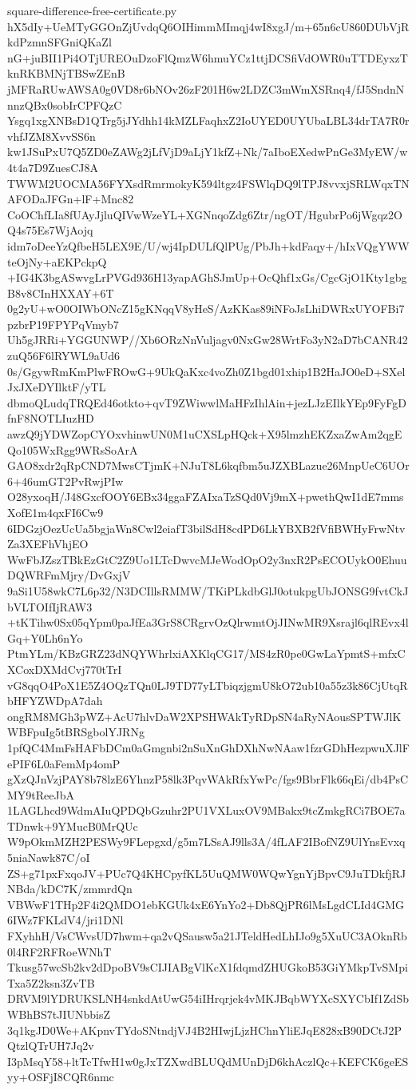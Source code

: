 \documentclass[11pt]{article}
\theoremstyle{definition}
\theoremstyle{remark}
\begin{document}
\begin{filecontents*}[overwrite]{square-difference-free-certificate.py}
hX5dIy+UeMTyGGOnZjUvdqQ6OIHimmMImqj4wI8xgJ/m+65n6cU860DUbVjRkdPzmnSFGniQKaZl
nG+juBII1Pi4OTjUREOuDzoFlQmzW6hmuYCz1ttjDCSfiVdOWR0uTTDEyxzTknRKBMNjTBSwZEnB
jMFRaRUwAWSA0g0VD8r6bNOv26zF201H6w2LDZC3mWmXSRnq4/fJ5SndnNnnzQBx0sobIrCPFQzC
Ysgq1xgXNBsD1QTrg5jJYdhh14kMZLFaqhxZ2IoUYED0UYUbaLBL34drTA7R0rvhfJZM8XvvSS6n
kw1JSuPxU7Q5ZD0eZAWg2jLfVjD9aLjY1kfZ+Nk/7aIboEXedwPnGe3MyEW/w4t4a7D9ZuesCJ8A
TWWM2UOCMA56FYXsdRmrmokyK594ltgz4FSWlqDQ9lTPJ8vvxjSRLWqxTNAFODaJFGn+lF+Mnc82
CoOChfLIa8fUAyJjluQIVwWzeYL+XGNnqoZdg6Ztr/ngOT/HgubrPo6jWgqz2OQ4s75Es7WjAojq
idm7oDeeYzQfbeH5LEX9E/U/wj4IpDULfQlPUg/PbJh+kdFaqy+/hIxVQgYWWteOjNy+aEKPckpQ
+IG4K3bgASwvgLrPVGd936H13yapAGhSJmUp+OcQhf1xGs/CgcGjO1Kty1gbgB8v8CInHXXAY+6T
0g2yU+wO0OIWbONcZ15gKNqqV8yHeS/AzKKas89iNFoJsLhiDWRxUYOFBi7pzbrP19FPYPqVmyb7
Uh5gJRRi+YGGUNWP//Xb6ORzNnVuljagv0NxGw28WrtFo3yN2aD7bCANR42zuQ56F6lRYWL9aUd6
0s/GgywRmKmPlwFROwG+9UkQaKxc4voZh0Z1bgd01xhip1B2HaJO0eD+SXelJxJXeDYIlktF/yTL
dbmoQLudqTRQEd46otkto+qvT9ZWiwwlMaHFzIhlAin+jezLJzEIlkYEp9FyFgDfnF8NOTLIuzHD
awzQ9jYDWZopCYOxvhinwUN0M1uCXSLpHQck+X95lmzhEKZxaZwAm2qgEQo105WxRgg9WRsSoArA
GAO8xdr2qRpCND7MwsCTjmK+NJuT8L6kqfbm5uJZXBLazue26MnpUeC6UOr6+46umGT2PvRwjPIw
O28yxoqH/J48GxcfOOY6EBx34ggaFZAIxaTzSQd0Vj9mX+pwethQwI1dE7mmsXofE1m4qxFI6Cw9
6IDGzjOezUcUa5bgjaWn8Cwl2eiafT3bilSdH8cdPD6LkYBXB2fVfiBWHyFrwNtvZa3XEFhVhjEO
WwFbJZszTBkEzGtC2Z9Uo1LTcDwvcMJeWodOpO2y3nxR2PsECOUykO0EhuuDQWRFmMjry/DvGxjV
9aSi1U58wkC7L6p32/N3DCIllsRMMW/TKiPLkdbGlJ0otukpgUbJONSG9fvtCkJbVLTOIfIjRAW3
+tKTihw0Sx05qYpm0paJfEa3GrS8CRgrvOzQlrwmtOjJINwMR9Xsrajl6qlREvx4lGq+Y0Lh6nYo
PtmYLm/KBzGRZ23dNQYWhrlxiAXKlqCG17/MS4zR0pe0GwLaYpmtS+mfxCXCoxDXMdCvj770tTrI
vG8qqO4PoX1E5Z4OQzTQn0LJ9TD77yLTbiqzjgmU8kO72ub10a55z3k86CjUtqRbHFYZWDpA7dah
ongRM8MGh3pWZ+AcU7hlvDaW2XPSHWAkTyRDpSN4aRyNAousSPTWJlKWBFpuIg5tBRSgbolYJRNg
1pfQC4MmFsHAFbDCm0aGmgnbi2nSuXnGhDXhNwNAaw1fzrGDhHezpwuXJlFePIF6L0aFemMp4omP
gXzQJnVzjPAY8b78lzE6YhnzP58lk3PqvWAkRfxYwPc/fgs9BbrFlk66qEi/db4PsCMY9tReeJbA
1LAGLhcd9WdmAIuQPDQbGzuhr2PU1VXLuxOV9MBakx9tcZmkgRCi7BOE7aTDnwk+9YMucB0MrQUc
W9pOkmMZH2PESWy9FLepgxd/g5m7LSsAJ9lls3A/4fLAF2IBofNZ9UlYnsEvxq5niaNawk87C/oI
ZS+g71pxFxqoJV+PUc7Q4KHCpyfKL5UuQMW0WQwYgnYjBpvC9JuTDkfjRJNBda/kDC7K/zmmrdQn
VBWwF1THp2F4i2QMDO1ebKGUk4xE6YnYo2+Db8QjPR6lMsLgdCLId4GMG6IWz7FKLdV4/jri1DNl
FXyhhH/VsCWvsUD7hwm+qa2vQSausw5a21JTeldHedLhIJo9g5XuUC3AOknRb0l4RF2RFRoeWNhT
Tkusg57wcSb2kv2dDpoBV9sCIJIABgVlKcX1fdqmdZHUGkoB53GiYMkpTvSMpiTxa5Z2ksn3ZvTB
DRVM9lYDRUKSLNH4snkdAtUwG54iIHrqrjek4vMKJBqbWYXcSXYCbIf1ZdSbWBhBS7tJIUNbbisZ
3q1kgJD0We+AKpnvTYdoSNtndjVJ4B2HIwjLjzHChnYliEJqE828xB90DCtJ2PQtzlQTrUH7Jq2v
I3pMsqY58+ltTcTfwH1w0gJxTZXwdBLUQdMUnDjD6khAczlQc+KEFCK6geESyy+OSFjI8CQR6nmc

\end{filecontents*}
\end{document}
